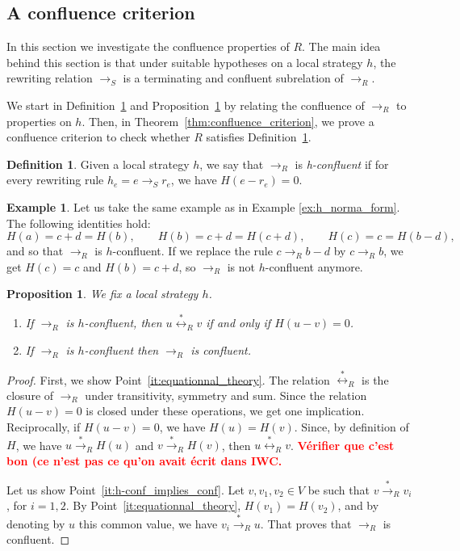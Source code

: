 \documentclass[10pt]{easychair}
\newtheorem{proposition}[theorem]{Proposition}
\theoremstyle{definition}
\newtheorem{definition}[theorem]{Definition}
\newtheorem{example}[theorem]{Example}
\newcommand\todo[1]{{\bf\textcolor{red}{#1.}}}
\newcommand\rewR{\to_R}
\newcommand\rewS{\to_S}
\newcommand\transR{\overset{*}{\to}_R}
\newcommand\equivR{\overset{*}{\leftrightarrow}_R}
\begin{document}
\subsection{A confluence criterion}
\label{sec:a_confluence_criterion}

In this section we investigate the confluence properties of $R$. The main
idea behind this section is that under suitable hypotheses on a local
strategy $h$, the rewriting relation $\rewS$ is a terminating and
confluent subrelation of $\rewR$.
\medskip

We start in Definition~\ref{def:standardisation_property} and 
Proposition~\ref{prop:h_and_R_confluence} by relating the confluence of
$\rewR$ to properties on $h$. Then, in
Theorem~\ref{thm:confluence_criterion}, we prove a confluence criterion
to check whether $R$ satisfies
Definition~\ref{def:standardisation_property}.

\begin{definition}\label{def:standardisation_property}
  Given a local strategy $h$, we say that $\rewR$ is \emph{h-confluent}
  if for every rewriting rule $h_e=e\rewS r_e$, we have $H(e-r_e)=0$.
\end{definition}
\smallskip

\begin{example}
  Let us take the same example as in Example \ref{ex:h_norma_form}. The
  following identities hold:
  \[
  H(a)=c+d=H(b),\qquad H(b)=c+d=H(c+d),\qquad H(c)=c= H(b-d),
  \]
  and so that $\rewR$ is $h$-confluent. If we replace the rule
  $c\rewR b-d$ by $c\rewR b$, we get $H(c)=c$ and $H(b)=c+d$, so $\rewR$
  is not $h$-confluent anymore. 
\end{example}
\smallskip

\begin{proposition}\label{prop:h_and_R_confluence}
  We fix a  local strategy $h$.
  \begin{enumerate}
  \item\label{it:equationnal_theory} If $\rewR$ is $h$-confluent, then
    $u\equivR v$ if and only if $H(u-v)=0$.
  \item\label{it:h-conf_implies_conf} If $\rewR$ is $h$-confluent then
    $\rewR$ is confluent.
  \end{enumerate}
\end{proposition}

\begin{proof}
  First, we show Point~\ref{it:equationnal_theory}. The relation
  $\equivR$ is the closure of $\rewR$ under transitivity, symmetry and
  sum. Since the relation $H(u - v) = 0$ is closed under these
  operations, we get one implication. Reciprocally, if $H(u-v)=0$, we
  have $H(u)=H(v)$. Since, by definition of $H$, we have
  $u\transR H(u)$ and $v\transR H(v)$, then $u\equivR v$.
  \todo{Vérifier que c'est bon (ce n'est pas ce qu'on avait écrit dans
    IWC}
  \smallskip
  
  Let us show Point~\ref{it:h-conf_implies_conf}. Let $v,v_1,v_2\in V$ be
  such that $v\transR v_i$, for $i=1,2$. By
  Point~\ref{it:equationnal_theory}, $H(v_1)=H(v_2)$, and by denoting by
  $u$ this common value, we have $v_i\transR u$. That proves that $\rewR$
  is confluent.
\end{proof}
\medskip
\end{document}
